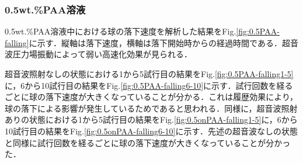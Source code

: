 \subsubsection{0.5wt.\%PAA溶液}

0.5wt.\%PAA溶液中における球の落下速度を解析した結果をFig.\ref{fig:0.5PAA-falling}に示す．縦軸は落下速度，横軸は落下開始時からの経過時間である．超音波圧力場振動によって弱い高速化効果が見られる．

超音波照射なしの状態における1から5試行目の結果をFig.\ref{fig:0.5PAA-falling1-5}に，6から10試行目の結果をFig.\ref{fig:0.5PAA-falling6-10}に示す．試行回数を経るごとに球の落下速度が大きくなっていることが分かる．これは履歴効果により，球の落下による影響が発生しているためであると思われる．同様に，超音波照射ありの状態における1から5試行目の結果をFig.\ref{fig:0.5onPAA-falling1-5}に，6から10試行目の結果をFig.\ref{fig:0.5onPAA-falling6-10}に示す．先述の超音波なしの状態と同様に試行回数を経るごとに球の落下速度が大きくなっていることが分かった．

